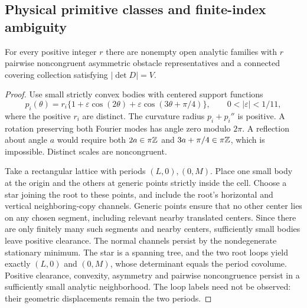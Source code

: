 \subsection{Physical primitive classes and finite-index ambiguity}
\begin{proposition}\label{prop:primitive}
For every positive integer $r$ there are nonempty open analytic families
with $r$ pairwise noncongruent asymmetric obstacle representatives and
a connected covering collection satisfying $|\det D|=V$.
\end{proposition}
\begin{proof}
Use small strictly convex bodies with centered support functions
\[
 p_i(\theta)=r_i\{1+\varepsilon\cos(2\theta)
                    +\varepsilon\cos(3\theta+\pi/4)\},
                \qquad 0<|\varepsilon|<1/11,
\]
where the positive $r_i$ are distinct. The curvature radius $p_i+p_i''$
is positive. A rotation preserving both Fourier modes has angle zero
modulo $2\pi$. A reflection about angle $a$ would require both
$2a\in\pi\mathbb Z$ and $3a+\pi/4\in\pi\mathbb Z$, which is impossible.
Distinct scales are noncongruent.

Take a rectangular lattice with periods $(L,0),(0,M)$. Place one small
body at the origin and the others at generic points strictly inside the
cell. Choose a star joining the root to these points, and include the
root's horizontal and vertical neighboring-copy channels. Generic points
ensure that no other center lies on any chosen segment, including relevant
nearby translated centers. Since there are only finitely many such
segments and nearby centers, sufficiently small bodies leave positive
clearance. The normal channels persist by the nondegenerate stationary
minimum. The star is a spanning tree, and the two root loops yield exactly
$(L,0)$ and $(0,M)$, whose determinant equals the period covolume.
Positive clearance, convexity, asymmetry and pairwise noncongruence persist
in a sufficiently small analytic neighborhood. The loop labels need not
be observed: their geometric displacements remain the two periods.
\end{proof}


